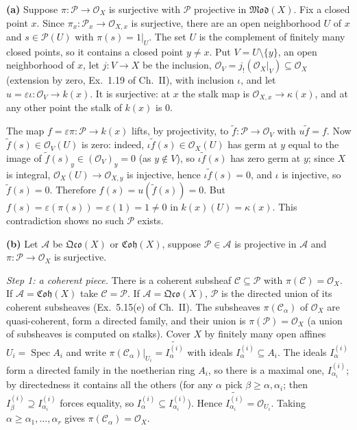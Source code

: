 \documentclass[11pt]{article}
\begin{document}
\textbf{(a)} Suppose $\pi\colon\mathcal P\to\mathcal O_X$ is surjective with $\mathcal P$ projective in $\mathfrak{Mod}(X)$. Fix a closed point $x$. Since $\pi_x\colon\mathcal P_x\to\mathcal O_{X,x}$ is surjective, there are an open neighborhood $U$ of $x$ and $s\in\mathcal P(U)$ with $\pi(s)=1|_U$. The set $U$ is the complement of finitely many closed points, so it contains a closed point $y\neq x$. Put $V=U\setminus\{y\}$, an open neighborhood of $x$, let $j\colon V\to X$ be the inclusion, $\mathcal O_V=j_!(\mathcal O_X|_V)\subseteq\mathcal O_X$ (extension by zero, Ex.~1.19 of Ch.~II), with inclusion $\iota$, and let $u=\varepsilon\iota\colon\mathcal O_V\to k(x)$. It is surjective: at $x$ the stalk map is $\mathcal O_{X,x}\to\kappa(x)$, and at any other point the stalk of $k(x)$ is $0$.

The map $f=\varepsilon\pi\colon\mathcal P\to k(x)$ lifts, by projectivity, to $\tilde f\colon\mathcal P\to\mathcal O_V$ with $u\tilde f=f$. Now $\tilde f(s)\in\mathcal O_V(U)$ is zero: indeed, $\iota\tilde f(s)\in\mathcal O_X(U)$ has germ at $y$ equal to the image of $\tilde f(s)_y\in(\mathcal O_V)_y=0$ (as $y\notin V$), so $\iota\tilde f(s)$ has zero germ at $y$; since $X$ is integral, $\mathcal O_X(U)\to\mathcal O_{X,y}$ is injective, hence $\iota\tilde f(s)=0$, and $\iota$ is injective, so $\tilde f(s)=0$. Therefore $f(s)=u(\tilde f(s))=0$. But $f(s)=\varepsilon(\pi(s))=\varepsilon(1)=1\neq0$ in $k(x)(U)=\kappa(x)$. This contradiction shows no such $\mathcal P$ exists.

\textbf{(b)} Let $\mathcal A$ be $\mathfrak{Qco}(X)$ or $\mathfrak{Coh}(X)$, suppose $\mathcal P\in\mathcal A$ is projective in $\mathcal A$ and $\pi\colon\mathcal P\to\mathcal O_X$ is surjective.

\emph{Step 1: a coherent piece.} There is a coherent subsheaf $\mathcal C\subseteq\mathcal P$ with $\pi(\mathcal C)=\mathcal O_X$. If $\mathcal A=\mathfrak{Coh}(X)$ take $\mathcal C=\mathcal P$. If $\mathcal A=\mathfrak{Qco}(X)$, $\mathcal P$ is the directed union of its coherent subsheaves (Ex.~5.15(e) of Ch.~II). The subsheaves $\pi(\mathcal C_\alpha)$ of $\mathcal O_X$ are quasi-coherent, form a directed family, and their union is $\pi(\mathcal P)=\mathcal O_X$ (a union of subsheaves is computed on stalks). Cover $X$ by finitely many open affines $U_i=\operatorname{Spec}A_i$ and write $\pi(\mathcal C_\alpha)|_{U_i}=\widetilde{I^{(i)}_\alpha}$ with ideals $I^{(i)}_\alpha\subseteq A_i$. The ideals $I^{(i)}_\alpha$ form a directed family in the noetherian ring $A_i$, so there is a maximal one, $I^{(i)}_{\alpha_i}$; by directedness it contains all the others (for any $\alpha$ pick $\beta\ge\alpha,\alpha_i$; then $I^{(i)}_\beta\supseteq I^{(i)}_{\alpha_i}$ forces equality, so $I^{(i)}_\alpha\subseteq I^{(i)}_{\alpha_i}$). Hence $\widetilde{I^{(i)}_{\alpha_i}}=\mathcal O_{U_i}$. Taking $\alpha\ge\alpha_1,\dots,\alpha_r$ gives $\pi(\mathcal C_\alpha)=\mathcal O_X$.
\end{document}
